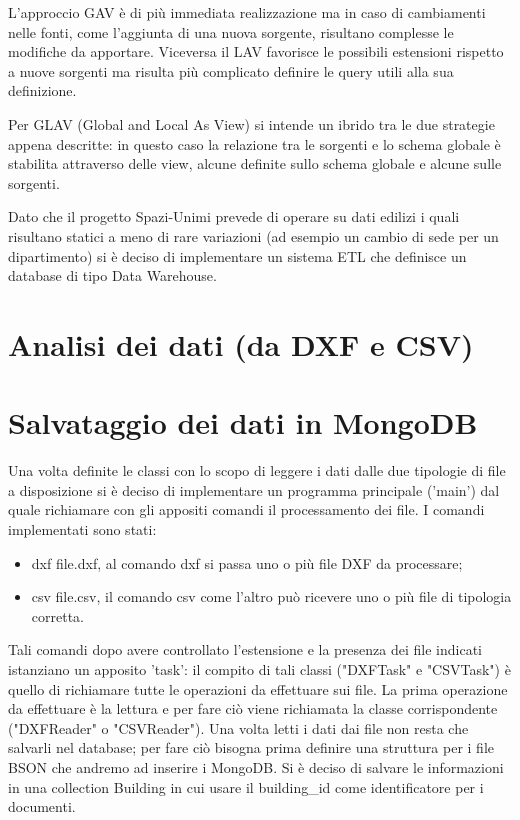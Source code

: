 \documentclass[12pt]{report}
\begin{document}
L'approccio GAV è di più immediata realizzazione ma in caso di cambiamenti nelle fonti, come l'aggiunta di una nuova sorgente, risultano complesse le modifiche da apportare.
Viceversa il LAV favorisce le possibili estensioni rispetto a nuove sorgenti ma risulta più complicato definire le query utili alla sua definizione.     

Per GLAV (Global and Local As View) si intende un ibrido tra le due strategie appena descritte: in questo caso la relazione tra le sorgenti e lo schema globale è stabilita attraverso delle view, alcune definite sullo schema globale e alcune sulle sorgenti.

Dato che il progetto Spazi-Unimi prevede di operare su dati edilizi i quali risultano statici a meno di rare variazioni (ad esempio un cambio di sede per un dipartimento) si è deciso di implementare un sistema ETL che definisce un database di tipo Data Warehouse.


\newpage
\section{Analisi dei dati (da DXF e CSV)}

\newpage
\section{Salvataggio dei dati in MongoDB}

Una volta definite le classi con lo scopo di leggere i dati dalle due tipologie di file a disposizione si è deciso di implementare un programma principale ('main') dal quale richiamare con gli appositi comandi il processamento dei file.
I comandi implementati sono stati:
\begin{itemize}
\item dxf file.dxf, al comando dxf si passa uno o più file DXF da processare;
\item csv file.csv, il comando csv come l'altro può ricevere uno o più file di tipologia corretta. 
\end{itemize}

Tali comandi dopo avere controllato l'estensione e la presenza dei file indicati istanziano un apposito 'task': il compito di tali classi ("DXFTask" e "CSVTask") è quello di richiamare tutte le operazioni da effettuare sui file.
La prima operazione da effettuare è la lettura e per fare ciò viene richiamata la classe corrispondente ("DXFReader" o "CSVReader"). 
Una volta letti i dati dai file non resta che salvarli nel database; per fare ciò bisogna prima definire una struttura per i file BSON che andremo ad inserire i MongoDB.
Si è deciso di salvare le informazioni in una collection Building in cui usare il building\_id come identificatore per i documenti.
\end{document}
